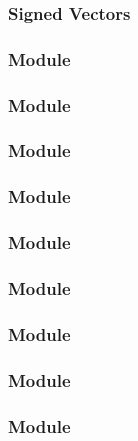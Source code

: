 \documentclass[t, notes, xcolor=table]{beamer}
\begin{document}
\begin{frame}
\frametitle{Signed Vectors}

\end{frame}

\begin{frame}
\frametitle{Module}

\end{frame}

\begin{frame}
\frametitle{Module}

\end{frame}

\begin{frame}
\frametitle{Module}

\end{frame}

\begin{frame}
\frametitle{Module}

\end{frame}

\begin{frame}
\frametitle{Module}

\end{frame}

\begin{frame}
\frametitle{Module}

\end{frame}

\begin{frame}
\frametitle{Module}

\end{frame}

\begin{frame}
\frametitle{Module}

\end{frame}

\begin{frame}
\frametitle{Module}

\end{frame}
\end{document}
